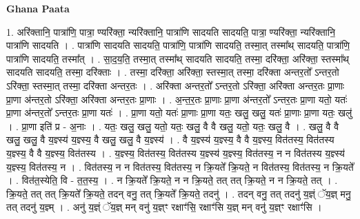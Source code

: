 \documentclass[17pt]{extarticle}
\begin{document}
\textbf{Ghana Paata } \newline

1. अरि॑क्तानि॒ पात्रा॑णि॒ पात्रा॒ ण्यरि॑क्ता॒ न्यरि॑क्तानि॒ पात्रा॑णि सादयति सादयति॒ पात्रा॒ ण्यरि॑क्ता॒ न्यरि॑क्तानि॒ पात्रा॑णि सादयति । . पात्रा॑णि सादयति सादयति॒ पात्रा॑णि॒ पात्रा॑णि सादयति॒ तस्मा॒त् तस्मा᳚थ् सादयति॒ पात्रा॑णि॒ पात्रा॑णि सादयति॒ तस्मा᳚त् । . सा॒द॒य॒ति॒ तस्मा॒त् तस्मा᳚थ् सादयति सादयति॒ तस्मा॒ दरि॑क्ता॒ अरि॑क्ता॒ स्तस्मा᳚थ् सादयति सादयति॒ तस्मा॒ दरि॑क्ताः । . तस्मा॒ दरि॑क्ता॒ अरि॑क्ता॒ स्तस्मा॒त् तस्मा॒ दरि॑क्ता अन्तर॒तो᳚ ऽन्तर॒तो ऽरि॑क्ता॒ स्तस्मा॒त् तस्मा॒ दरि॑क्ता अन्तर॒तः । . अरि॑क्ता अन्तर॒तो᳚ ऽन्तर॒तो ऽरि॑क्ता॒ अरि॑क्ता अन्तर॒तः प्रा॒णाः प्रा॒णा अ॑न्तर॒तो ऽरि॑क्ता॒ अरि॑क्ता अन्तर॒तः प्रा॒णाः । . अ॒न्त॒र॒तः प्रा॒णाः प्रा॒णा अ॑न्तर॒तो᳚ ऽन्तर॒तः प्रा॒णा यतो॒ यतः॑ प्रा॒णा अ॑न्तर॒तो᳚ ऽन्तर॒तः प्रा॒णा यतः॑ । . प्रा॒णा यतो॒ यतः॑ प्रा॒णाः प्रा॒णा यतः॒ खलु॒ खलु॒ यतः॑ प्रा॒णाः प्रा॒णा यतः॒ खलु॑ । . प्रा॒णा इति॑ प्र - अ॒नाः । . यतः॒ खलु॒ खलु॒ यतो॒ यतः॒ खलु॒ वै वै खलु॒ यतो॒ यतः॒ खलु॒ वै । . खलु॒ वै वै खलु॒ खलु॒ वै य॒ज्ञ्स्य॑ य॒ज्ञ्स्य॒ वै खलु॒ खलु॒ वै य॒ज्ञ्स्य॑ । . वै य॒ज्ञ्स्य॑ य॒ज्ञ्स्य॒ वै वै य॒ज्ञ्स्य॒ वित॑तस्य॒ वित॑तस्य य॒ज्ञ्स्य॒ वै वै य॒ज्ञ्स्य॒ वित॑तस्य । . य॒ज्ञ्स्य॒ वित॑तस्य॒ वित॑तस्य य॒ज्ञ्स्य॑ य॒ज्ञ्स्य॒ वित॑तस्य॒ न न वित॑तस्य य॒ज्ञ्स्य॑ य॒ज्ञ्स्य॒ वित॑तस्य॒ न । . वित॑तस्य॒ न न वित॑तस्य॒ वित॑तस्य॒ न क्रि॒यते᳚ क्रि॒यते॒ न वित॑तस्य॒ वित॑तस्य॒ न क्रि॒यते᳚ । . वित॑त॒स्येति॒ वि - त॒त॒स्य॒ । . न क्रि॒यते᳚ क्रि॒यते॒ न न क्रि॒यते॒ तत् तत् क्रि॒यते॒ न न क्रि॒यते॒ तत् । . क्रि॒यते॒ तत् तत् क्रि॒यते᳚ क्रि॒यते॒ तदन् वनु॒ तत् क्रि॒यते᳚ क्रि॒यते॒ तदनु॑ । . तदन् वनु॒ तत् तदनु॑ य॒ज्ञ्ं ॅय॒ज्ञ् मनु॒ तत् तदनु॑ य॒ज्ञ्म् । . अनु॑ य॒ज्ञ्ं ॅय॒ज्ञ् मन् वनु॑ य॒ज्ञ्ꣳ रक्षाꣳ॑सि॒ रक्षाꣳ॑सि य॒ज्ञ् मन् वनु॑ य॒ज्ञ्ꣳ रक्षाꣳ॑सि । \newline
\end{document}
